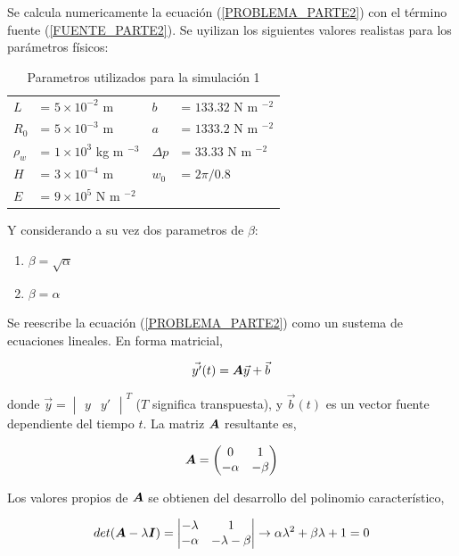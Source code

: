 Se calcula numericamente la ecuación (\ref{PROBLEMA_PARTE2}) con el término fuente (\ref{FUENTE_PARTE2}).  Se uyilizan los siguientes valores realistas para los parámetros físicos:
\begin{table} [H]
\centering
\begin{tabular}{llll}
$L$		& = $5 \times 10 ^ {-2}$ m 				&	$b$	 		&= $133.32$ N m $^{-2}$ \\
$R_0$	& = $5 \times 10 ^ {-3}$ m 				&	$a$		 	&= $1333.2$ N m $^{-2}$ \\
$\rho_w$& = $1 \times 10 ^ {3}$ kg m $^{-3}$ 	&	$\Delta p$ 	&= $33.33$ N m $^{-2}$ \\
$H$		& = $3 \times 10 ^ {-4}$ m 				&	$w_0$ 		&= $2 \pi / 0.8$ \\
$E$		& = $9 \times 10 ^ {5}$ N m $^{-2}$ 	&				&
\end{tabular}
\caption{Parametros utilizados para la simulación 1} \label{PARAMETROS_PARTE2}
\end{table}

Y considerando a su vez dos parametros de $\beta$:
\begin{enumerate}[label=(\alph*)]
\item $\beta = \sqrt{ \alpha }$ 
\item $\beta = \alpha$
\end{enumerate}

Se reescribe la ecuación (\ref{PROBLEMA_PARTE2}) como un sustema de ecuaciones lineales. En forma matricial,

\begin{equation} \label{PROBLEMA_PARTE2_CORREGIDO}
\vec{y'}(t) = \boldsymbol{A} \vec{y} + \vec{b}
\end{equation}

donde $\vec{y} = \begin{vmatrix} y & y' \end{vmatrix}^T$ ($T$ significa transpuesta), y $\vec{b}(t)$ es un vector fuente dependiente del tiempo $t$. La matriz $\boldsymbol{A}$ resultante es,

\begin{equation}
\boldsymbol{A} = \begin{pmatrix}
0 & 1 \\ -\alpha & -\beta
\end{pmatrix}
\end{equation}

Los valores propios de $\boldsymbol{A}$ se obtienen del desarrollo del polinomio característico,

\begin{equation}
det(\boldsymbol{A} - \lambda \boldsymbol{I}) = \begin{vmatrix}
-\lambda & 1 \\
-\alpha & -\lambda -\beta 
\end{vmatrix} \rightarrow \alpha \lambda^2 + \beta \lambda + 1 = 0
\end{equation}

